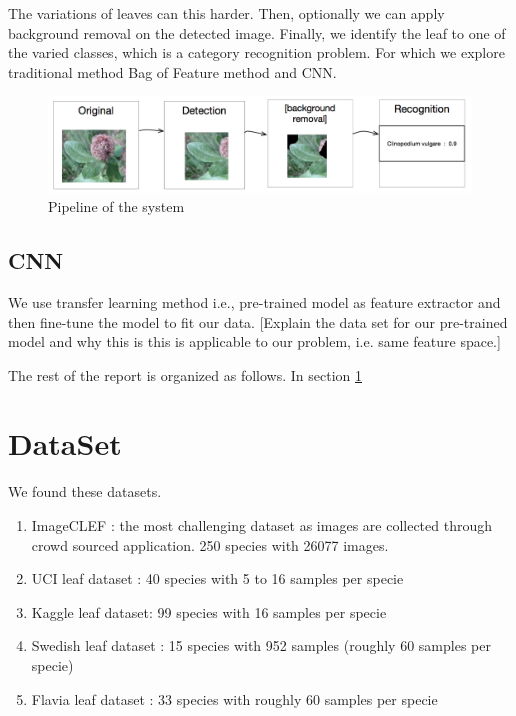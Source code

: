 \documentclass[journal]{IEEEtran}
\begin{document}
The variations of leaves can this harder.  Then, optionally we can apply background removal on the detected image.  Finally, we identify the leaf to one of the varied classes, which is a category recognition problem. For which we explore traditional method Bag of Feature method and CNN. 

\newpage
\graphicspath{{../design/}}
\begin{figure} 
  \center
  \includegraphics[scale=0.2]{overview}
  \caption{ Pipeline of the system }
  \label{fig:pipeline}
\end{figure}

\subsection{CNN}
We use transfer learning method i.e., pre-trained model as feature extractor and then fine-tune the model to fit our data. [Explain the data set for our pre-trained model and why this is this is applicable to our problem, i.e. same feature space.]

The rest of the report is organized as follows. In section \ref{DataSet}

\section{DataSet}
\label{DataSet}
We found these datasets.
\begin{enumerate}
  \item ImageCLEF \cite{ImageCLEF2013}: the most challenging dataset as images are collected through crowd sourced application. 250 species with 26077 images.
  \item UCI leaf dataset \cite{UCIDataSet}: 40 species with 5 to 16 samples per specie
  \item Kaggle leaf dataset\cite{Pedro13}: 99 species with 16 samples per specie
  \item Swedish leaf dataset \cite{SwedishLeafDataset}: 15 species with 952 samples (roughly 60 samples per specie)
  \item Flavia leaf dataset \cite{FlaviaDataset}: 33 species with roughly 60 samples per specie
\end{enumerate}
\end{document}
